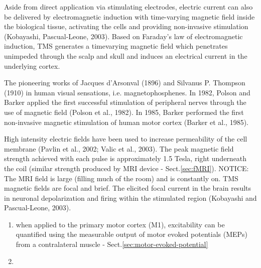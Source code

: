 Aside from direct application via stimulating electrodes, electric current can
also be delivered by electromagnetic induction with time-varying magnetic field
inside the biological tissue, activating the cells and providing non-invasive
stimulation (Kobayashi, Pascual-Leone, 2003).
Based on Faraday's law of electromagnetic induction, TMS generates a timevarying
magnetic field which penetrates unimpeded through the scalp and skull and
induces an electrical current in the underlying cortex.

The pioneering works of Jacques d'Arsonval (1896) and Silvanus P. Thompson
(1910) in human visual sensations, i.e. magnetophosphenes. In 1982, Polson and
Barker applied the first successful stimulation of peripheral nerves through the
use of magnetic field (Polson et al., 1982). In 1985, Barker performed the first
non-invasive magnetic stimulation of human motor cortex (Barker et al., 1985).




High intensity electric fields have been used to increase permeability of the
cell membrane (Pavlin et al., 2002; Valic et al., 2003).
The peak magnetic field strength achieved with each pulse is approximately 1.5
Tesla, right underneath the coil (similar strength produced by MRI device -
Sect.\ref{sec:fMRI}). NOTICE: The MRI field is large (filling much of the room)
and is constantly on. TMS magnetic fields are focal and brief.
The elicited focal current in the brain results in neuronal
depolarization and firing within the stimulated region (Kobayashi
and Pascual-Leone, 2003).
\begin{enumerate}
  \item  when applied to the primary motor cortex (M1), excitability can be
  quantified using the measurable output of motor evoked potentials (MEPs) from
  a contralateral muscle - Sect.\ref{sec:motor-evoked-potential}
  
  \item 
\end{enumerate}

  
% 

